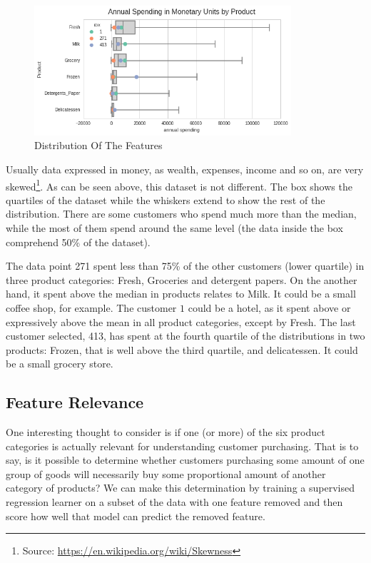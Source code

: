 \documentclass[a4paper]{article}
\begin{document}
\begin{figure}[ht!]
\centering
\includegraphics[width=0.85\textwidth]{figures/boxplot_features_new.png}
\caption{\label{fig:boxplot}Distribution Of The Features}
\end{figure}

Usually data expressed in money, as wealth, expenses, income and so on, are very skewed\footnote{Source: \url{https://en.wikipedia.org/wiki/Skewness}}. As can be seen above, this dataset is not different. The box shows the quartiles of the dataset while the whiskers extend to show the rest of the distribution. There are some customers who spend much more than the median, while the most of them spend around the same level (the data inside the box comprehend 50\% of the dataset).

The data point 271 spent less than 75\% of the other customers (lower quartile) in three product categories: Fresh, Groceries and detergent papers. On the another hand, it spent above the median in products relates to Milk. It could be a small coffee shop, for example. The customer $1$ could be a hotel, as it spent above or expressively above the mean in all product categories, except by Fresh. The last customer selected, 413, has spent at the fourth quartile of the distributions in two products: Frozen, that is well above the third quartile, and delicatessen. It could be a small grocery store.

\subsection{Feature Relevance}
One interesting thought to consider is if one (or more) of the six product categories is actually relevant for understanding customer purchasing. That is to say, is it possible to determine whether customers purchasing some amount of one group of goods will necessarily buy some proportional amount of another category of products? We can make this determination by training a supervised regression learner on a subset of the data with one feature removed and then score how well that model can predict the removed feature.
\end{document}
